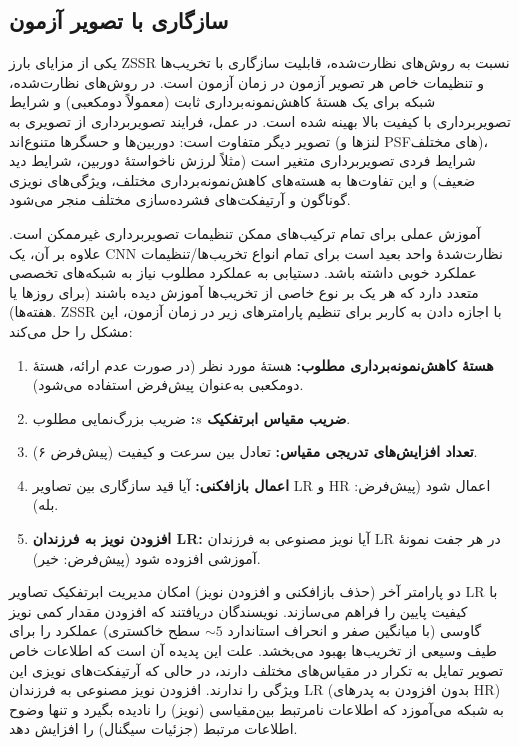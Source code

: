 \subsection{سازگاری با تصویر آزمون}
\label{subsec:adaptation}

یکی از مزایای بارز ZSSR نسبت به روش‌های نظارت‌شده، قابلیت سازگاری
با تخریب‌ها و تنظیمات خاص هر تصویر آزمون در زمان آزمون است. در
روش‌های نظارت‌شده، شبکه برای یک هستهٔ کاهش‌نمونه‌برداری ثابت (معمولاً
دومکعبی) و شرایط تصویربرداری با کیفیت بالا بهینه شده است. در عمل،
فرایند تصویربرداری از تصویری به تصویر دیگر متفاوت است: دوربین‌ها و
حسگرها متنوع‌اند (لنزها و PSFهای مختلف)، شرایط فردی تصویربرداری
متغیر است (مثلاً لرزش ناخواستهٔ دوربین، شرایط دید ضعیف) و
این تفاوت‌ها به هسته‌های کاهش‌نمونه‌برداری مختلف، ویژگی‌های نویزی
گوناگون و آرتیفکت‌های فشرده‌سازی مختلف منجر می‌شود.

آموزش عملی برای تمام ترکیب‌های ممکن تنظیمات تصویربرداری غیرممکن
است. علاوه بر آن، یک CNN نظارت‌شدهٔ واحد بعید است برای تمام انواع
تخریب‌ها/تنظیمات عملکرد خوبی داشته باشد. دستیابی به عملکرد مطلوب
نیاز به شبکه‌های تخصصی متعدد دارد که هر یک بر نوع خاصی از تخریب‌ها
آموزش دیده باشند (برای روزها یا هفته‌ها). ZSSR با اجازه دادن به
کاربر برای تنظیم پارامترهای زیر در زمان آزمون، این مشکل را حل
می‌کند:

\begin{enumerate}
	\item \textbf{هستهٔ کاهش‌نمونه‌برداری مطلوب:} هستهٔ مورد نظر
	(در صورت عدم ارائه، هستهٔ دومکعبی به‌عنوان پیش‌فرض استفاده می‌شود).
	\item \textbf{ضریب مقیاس ابرتفکیک $s$:} ضریب بزرگ‌نمایی مطلوب.
	\item \textbf{تعداد افزایش‌های تدریجی مقیاس:} تعادل بین سرعت و
	کیفیت (پیش‌فرض ۶).
	\item \textbf{اعمال بازافکنی:} آیا قید سازگاری بین تصاویر LR و HR
	اعمال شود (پیش‌فرض: بله).
	\item \textbf{افزودن نویز به فرزندان LR:} آیا نویز مصنوعی به
	فرزندان LR در هر جفت نمونهٔ آموزشی افزوده شود (پیش‌فرض: خیر).
\end{enumerate}

دو پارامتر آخر (حذف بازافکنی و افزودن نویز) امکان مدیریت ابرتفکیک
تصاویر LR با کیفیت پایین را فراهم می‌سازند. نویسندگان دریافتند که
افزودن مقدار کمی نویز گاوسی (با میانگین صفر و انحراف استاندارد
$\sim 5$ سطح خاکستری) عملکرد را برای طیف وسیعی از تخریب‌ها بهبود
می‌بخشد. علت این پدیده آن است که اطلاعات خاص تصویر تمایل به تکرار
در مقیاس‌های مختلف دارند، در حالی که آرتیفکت‌های نویزی این ویژگی
را ندارند. افزودن نویز مصنوعی به
فرزندان LR (بدون افزودن به پدرهای HR) به شبکه می‌آموزد که
اطلاعات نامرتبط بین‌مقیاسی (نویز) را نادیده بگیرد و تنها وضوح
اطلاعات مرتبط (جزئیات سیگنال) را افزایش دهد.

